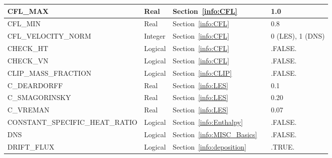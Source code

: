 \documentclass[11pt]{book}
\begin{document}
\begin{longtable}{@{\extracolsep{\fill}}|l|l|l|l|l|}
{\ct CFL\_MAX}                                  & Real          & Section~\ref{info:CFL}                                &               & 1.0               \\ \hline
{\ct CFL\_MIN}                                  & Real          & Section~\ref{info:CFL}                                &               & 0.8               \\ \hline
{\ct CFL\_VELOCITY\_NORM}                       & Integer       & Section~\ref{info:CFL}                                &               & 0 (LES), 1 (DNS)  \\ \hline
{\ct CHECK\_HT}                                 & Logical       & Section~\ref{info:CFL}                                &               & {\ct .FALSE.}     \\ \hline
{\ct CHECK\_VN}                                 & Logical       & Section~\ref{info:CFL}                                &               & {\ct .FALSE.}     \\ \hline
{\ct CLIP\_MASS\_FRACTION}                      & Logical       & Section~\ref{info:CLIP}                               &               & {\ct .FALSE.}     \\ \hline
{\ct C\_DEARDORFF}                              & Real          & Section~\ref{info:LES}                                &               & 0.1               \\ \hline
{\ct C\_SMAGORINSKY}                            & Real          & Section~\ref{info:LES}                                &               & 0.20              \\ \hline
{\ct C\_VREMAN}                                 & Real          & Section~\ref{info:LES}                                &               & 0.07              \\ \hline
{\ct CONSTANT\_SPECIFIC\_HEAT\_RATIO}           & Logical       & Section~\ref{info:Enthalpy}                           &               & {\ct .FALSE.}     \\ \hline
{\ct DNS}                                       & Logical       & Section~\ref{info:MISC_Basics}                        &               & {\ct .FALSE.}     \\ \hline
{\ct DRIFT\_FLUX}                               & Logical       & Section~\ref{info:deposition}                         &               & {\ct .TRUE.}      \\ \hline

\end{longtable}
\end{document}
